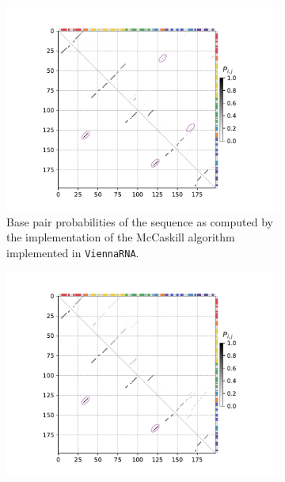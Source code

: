 \documentclass[../../master.tex]{subfiles}
\begin{document}
\begin{figure}[!ht]
	\centering
	\begin{subfigure}[t]{0.5\textwidth}
		\centering
		\includegraphics[trim=50 10 70 10, clip, width=\textwidth]{pic/results/designs/dotplots/dot_azo_gissd_viennarna.pdf}
		\caption{Base pair probabilities of the sequence as computed by the implementation of the McCaskill algorithm implemented in \texttt{ViennaRNA}. %
		}\label{fig:bpp_gissd:a}
	\end{subfigure}%
	\begin{subfigure}[t]{0.5\textwidth}
		\centering
		\includegraphics[trim=50 10 70 10, clip, width=\textwidth]{pic/results/designs/dotplots/dot_azo_gissd_nupack.pdf}

\end{subfigure}
\end{figure}
\end{document}
